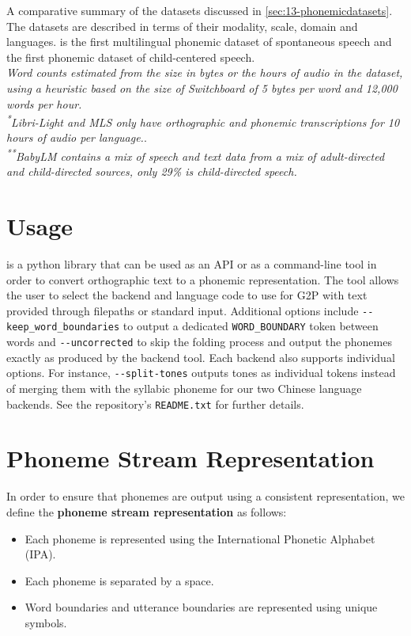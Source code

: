 \begin{table}[t]
\begin{threeparttable}
        \caption{A comparative summary of the datasets discussed in \cref{sec:13-phonemicdatasets}. The datasets are described in terms of their modality, scale, domain and languages. \ipachildes is the first multilingual phonemic dataset of spontaneous speech and the first phonemic dataset of child-centered speech. \\\emph{\textdagger Word counts estimated from the size in bytes or the hours of audio in the dataset, using a heuristic based on the size of Switchboard of 5 bytes per word and 12,000 words per hour.}\\\emph{\textsuperscript{*}Libri-Light and MLS only have orthographic and phonemic transcriptions for 10 hours of audio per language.}.\\\emph{\textsuperscript{**}BabyLM contains a mix of speech and text data from a mix of adult-directed and child-directed sources, only 29\% is child-directed speech.}}
        \label{tab:13-dataset-requirements}
    \end{threeparttable}
\end{table}
\setlength{\tabcolsep}{6pt}

\section{\gpp Usage}\label{app:13-usage}

\gpp is a python library that can be used as an API or as a command-line tool in order to convert orthographic text to a phonemic representation. The tool allows the user to select the backend and language code to use for G2P with text provided through filepaths or standard input. Additional options include \verb|--keep_word_boundaries| to output a dedicated \texttt{WORD\_BOUNDARY} token between words and \verb|--uncorrected| to skip the folding process and output the phonemes exactly as produced by the backend tool. Each backend also supports individual options. For instance, \verb|--split-tones| outputs tones as individual tokens instead of merging them with the syllabic phoneme for our two Chinese language backends. See the repository's \texttt{README.txt} for further details.

\section{Phoneme Stream Representation}\label{sec:13-phonemestream}

In order to ensure that phonemes are output using a consistent representation, we define the \textbf{phoneme stream representation} as follows:
\begin{itemize}
    \item Each phoneme is represented using the International Phonetic Alphabet (IPA).
    \item Each phoneme is separated by a space.
    \item Word boundaries and utterance boundaries are represented using unique symbols.
\end{itemize}

